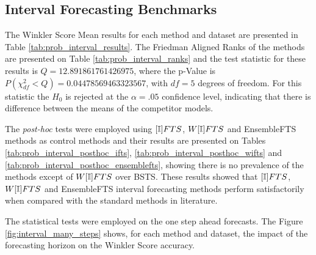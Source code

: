 %
\subsection{Interval Forecasting Benchmarks}
\label{sec:prob_experiments_interval}

The Winkler Score Mean results for each method and dataset are presented in Table \ref{tab:prob_interval_results}. The Friedman Aligned Ranks of the methods are presented on Table \ref{tab:prob_interval_ranks} and the test statistic for these results is $Q = 12.891861761426975$, where the p-Value is $P(\chi^2_{df} < Q) = 0.04478569463323567$, with $df=5$ degrees of freedom. For this statistic the $H_0$ is rejected at the $\alpha=.05$ confidence level, indicating that there is difference between the means of the competitor models.

The \textit{post-hoc} tests were employed using $[\mathbb{I}]FTS$, $W[\mathbb{I}]FTS$ and EnsembleFTS methods as control methods and their results are presented on Tables \ref{tab:prob_interval_posthoc_ifts}, \ref{tab:prob_interval_posthoc_wifts} and \ref{tab:prob_interval_posthoc_ensemblefts}, showing there is no prevalence of the methods except of $W[\mathbb{I}]FTS$ over BSTS. These results showed that $[\mathbb{I}]FTS$, $W[\mathbb{I}]FTS$ and EnsembleFTS interval forecasting methods perform satisfactorily when compared with the standard methods in literature. 

The statistical tests were employed on the one step ahead forecasts. The Figure \ref{fig:interval_many_steps} shows, for each method and dataset, the impact of the forecasting horizon on the Winkler Score accuracy.

